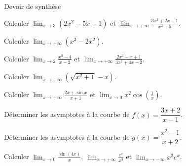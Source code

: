 \begin{exercice}[3]{Devoir de synthèse}
\begin{questions}
  \item Calculer $\displaystyle\lim_{x\to3}\left(2x^{2}-5x+1\right)$ et $\displaystyle\lim_{x\to+\infty}\frac{3x^{2}+2x-1}{x^{2}+5}$.
  \item Calculer $\displaystyle\lim_{x\to+\infty}\left(x^{3}-2x^{2}\right)$.
\end{questions}
\begin{questions}[resume]
  \item Calculer $\displaystyle\lim_{x\to2}\frac{x^{2}-4}{x-2}$ et $\displaystyle\lim_{x\to+\infty}\frac{2x^{2}-x+1}{3x^{2}+4x-2}$.
  \item Calculer $\displaystyle\lim_{x\to+\infty}\left(\sqrt{x^{2}+1}-x\right)$.
\end{questions}
\begin{questions}[resume]
  \item Calculer $\displaystyle\lim_{x\to+\infty}\frac{2x+\sin x}{x+1}$ et $\displaystyle\lim_{x\to0}x^{2}\cos\left(\frac{1}{x}\right)$.
\end{questions}
\begin{questions}[resume]
  \item Déterminer les asymptotes à la courbe de $f(x)=\dfrac{3x+2}{x-1}$.
  \item Déterminer les asymptotes à la courbe de $g(x)=\dfrac{x^{2}-1}{x+2}$.
\end{questions}
\begin{questions}[resume]
  \item Calculer $\displaystyle\lim_{x\to0}\frac{\sin(4x)}{x}$, $\displaystyle\lim_{x\to+\infty}\frac{e^{x}}{x^{3}}$ et $\displaystyle\lim_{x\to-\infty}x^{2}e^{x}$.
\end{questions}
\end{exercice}

